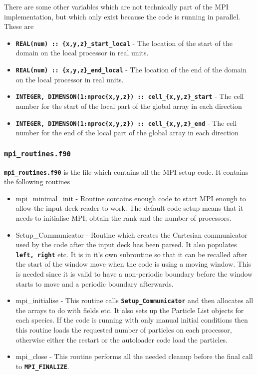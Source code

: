 \documentclass[12pt,a4paper]{article}
\newcommand{\inlinecode}[1]{{\color{warwickred} \bf\texttt{#1}}}
\newcommand{\EPOCH}{{\color{warwickdark}\fontfamily{phv}\selectfont{EPOCH}}}
\begin{document}
There are some other variables which are not technically part of the MPI
implementation, but which only exist because the code is running in
parallel. These are
\begin{itemize}
\item \inlinecode{REAL(num) :: \{x,y,z\}\_start\_local} - The location of the
  start of the domain on the local processor in real units.
\item \inlinecode{REAL(num) :: \{x,y,z\}\_end\_local} - The location of the end
  of the domain on the local processor in real units.
\item \inlinecode{INTEGER, DIMENSON(1:nproc\{x,y,z\}) ::
    cell\_\{x,y,z\}\_start} - The cell number for the start of the local part
  of the global array in each direction
\item \inlinecode{INTEGER, DIMENSON(1:nproc\{x,y,z\}) :: cell\_\{x,y,z\}\_end}
  - The cell number for the end of the local part of the global array in each
  direction
\end{itemize}

\subsubsection{\inlinecode{mpi\_routines.f90}}
\inlinecode{mpi\_routines.f90} is the file which contains all the MPI setup
code. It contains the following routines
\begin{itemize}
\item mpi\_minimal\_init - Routine contains enough code to start MPI enough to
  allow the input deck reader to work. The default {\EPOCH} code setup means that
  it needs to initialise MPI, obtain the rank and the number of processors.
\item Setup\_Communicator - Routine which creates the Cartesian communicator
  used by the code after the input deck has been parsed. It also populates
  \inlinecode{left, right} etc. It is in it's own subroutine so that it can be
  recalled after the start of the window move when the code is using a moving
  window. This is needed since it is valid to have a non-periodic boundary
  before the window starts to move and a periodic boundary afterwards.
\item mpi\_initialise - This routine calls \inlinecode{Setup\_Communicator} and
  then allocates all the arrays to do with fields etc. It also sets up the
  Particle List objects for each species. If the code is running with only
  manual initial conditions then this routine loads the requested number of
  particles on each processor, otherwise either the restart or the autoloader
  code load the particles.
\item mpi\_close - This routine performs all the needed cleanup before the
  final call to \inlinecode{MPI\_FINALIZE}.
\end{itemize}
\end{document}
